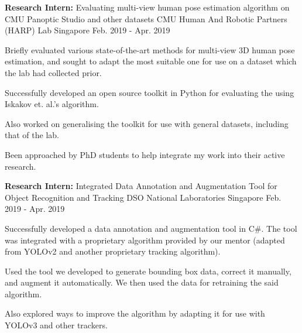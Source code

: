 \begin{cventries}

\label{computerVisionProjectCMU}

\cventry
{
	\textbf{Research Intern:}  Evaluating multi-view human pose estimation algorithm on CMU Panoptic Studio and other datasets  
} %
{CMU Human And Robotic Partners (HARP) Lab} %
{Singapore} %
{Feb. 2019 - Apr. 2019} %
{ %
	\begin{cvitems}
		\item { Briefly evaluated various state-of-the-art methods for multi-view 3D human pose estimation, and sought to adapt the most suitable one for use on a dataset which the lab had collected prior.}
		\item { Successfully developed an open source toolkit in Python for evaluating the  using Iskakov et. al.'s   algorithm.}
		\item { Also worked on generalising the toolkit for use with general datasets, including that of the lab.}
        \item { Been approached by PhD students to help integrate my work into their active research. }
	\end{cvitems}
}


\label{computerVisionProjectDSO}

\cventry
{
	\textbf{Research Intern:} Integrated Data Annotation and Augmentation Tool for Object Recognition and Tracking
} %
{DSO National Laboratories} %
{Singapore} %
{Feb. 2019 - Apr. 2019} %
{ %
	\begin{cvitems}
		\item { Successfully developed a data annotation and augmentation tool in C\#. The tool was integrated with a proprietary algorithm provided by our mentor (adapted from YOLOv2 and another proprietary tracking algorithm).}
		\item { Used the tool we developed to generate bounding box data, correct it manually, and augment it automatically. We then used the data for retraining the said algorithm.}
		\item { Also explored ways to improve the algorithm by adapting it for use with YOLOv3 and other trackers.}
	\end{cvitems}
}


\end{cventries}
